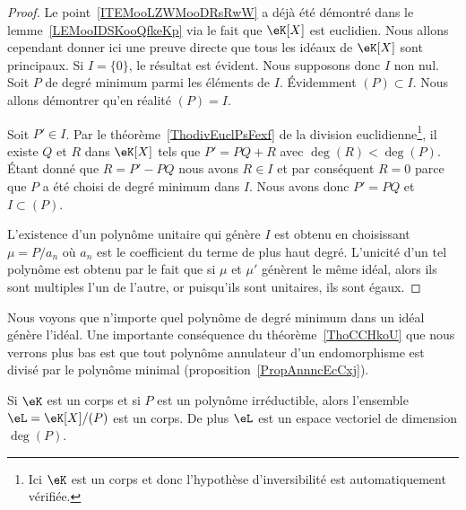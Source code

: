 \begin{proof}
	Le point~\ref{ITEMooLZWMooDRsRwW} a déjà été démontré dans le lemme~\ref{LEMooIDSKooQfkeKp} via le fait que \( \eK[X]\) est euclidien. Nous allons cependant donner ici une preuve directe que tous les idéaux de \( \eK[X]\) sont principaux. Si \( I=\{ 0 \}\), le résultat est évident. Nous supposons donc \( I\) non nul. Soit \( P\) de degré minimum parmi les éléments de \( I\). Évidemment \( (P)\subset I\). Nous allons démontrer qu'en réalité \( (P)=I\).

	Soit \( P'\in I\). Par le théorème~\ref{ThodivEuclPsFexf} de la division euclidienne\footnote{Ici \( \eK\) est un corps et donc l'hypothèse d'inversibilité est automatiquement vérifiée.}, il existe \( Q\) et \( R\) dans \( \eK[X]\) tels que \( P'=PQ+R\) avec \( \deg(R)<\deg(P)\). Étant donné que \( R=P'-PQ\) nous avons \( R\in I\) et par conséquent \( R=0\) parce que \( P\) a été choisi de degré minimum dans \( I\). Nous avons donc \( P'=PQ\) et \( I\subset (P)\).

	L'existence d'un polynôme unitaire qui génère \( I\) est obtenu en choisissant \( \mu =P/a_n\) où \( a_n\) est le coefficient du terme de plus haut degré. L'unicité d'un tel polynôme est obtenu par le fait que si \( \mu \) et \( \mu' \) génèrent le même idéal, alors ils sont multiples l'un de l'autre, or puisqu'ils sont unitaires, ils sont égaux.
\end{proof}
Nous voyons que n'importe quel polynôme de degré minimum dans un idéal génère l'idéal. Une importante conséquence du théorème~\ref{ThoCCHkoU} que nous verrons plus bas est que tout polynôme annulateur d'un endomorphisme est divisé par le polynôme minimal (proposition~\ref{PropAnnncEcCxj}).

\begin{corollary}       \label{CorsLGiEN}
	Si \( \eK\) est un corps et si \( P\) est un polynôme irréductible, alors l'ensemble \( \eL=\eK[X]/(P)\) est un corps. De plus \( \eL\) est un espace vectoriel de dimension \( \deg(P)\).
\end{corollary}

